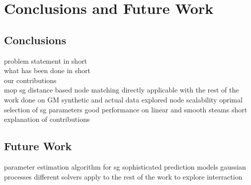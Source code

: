 \chapter{Conclusions and Future Work} \label{chap:concFuture}

\section{Conclusions} \label{sec:concFuture-conc}



problem statement in short\\
what has been done in short\\
our contributions\\
mop
sg
distance based node matching
directly applicable with the rest of the work done on GM
synthetic and actual data
explored node scalability
oprimal selection of sg parameters
good performance on linear and smooth steams
short explanation of contributions 

\section{Future Work} \label{sec:concFuture-future}

parameter estimation algorithm for sg
sophisticated prediction models
gaussian processes
different solvers
apply to the rest of the work to explore interraction
